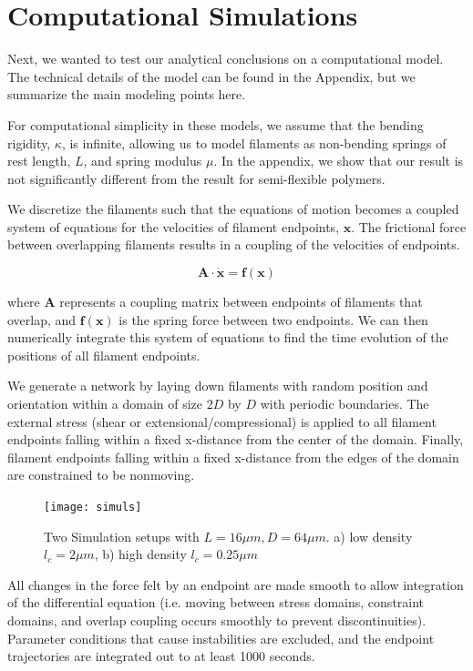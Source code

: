 \documentclass[prb,11pt]{revtex4-1}
\begin{document}
\section{Computational Simulations}

Next, we wanted to test our analytical conclusions on a computational model.  The technical details of the model can be found in the Appendix, but we summarize the main modeling points here.

For computational simplicity in these models, we assume that the bending rigidity, $\kappa$, is infinite, allowing us to model filaments as non-bending springs of rest length, $L$, and spring modulus $\mu$.  In the appendix, we show that our result is not significantly different from the result for semi-flexible polymers.

We discretize the filaments such that the equations of motion becomes a coupled system of equations for the velocities of filament endpoints, $\mathbf{x}$.  The frictional force between overlapping filaments results in a coupling of the velocities of endpoints.  

\begin{equation}
\mathbf{A \cdot \dot x} = \mathbf{f(x)}
\end{equation}

where $\mathbf{A }$ represents a coupling matrix between endpoints of filaments that overlap, and $\mathbf{f(x)}$ is the spring force between two endpoints.  We can then numerically integrate this system of equations to find the time evolution of the positions of all filament endpoints.

We generate a network by laying down filaments with random position and orientation within a domain of size $2D$ by $D$ with periodic boundaries.  The external stress (shear or extensional/compressional) is applied to all filament endpoints falling within a fixed x-distance from the center of the domain.  Finally, filament endpoints falling within a fixed x-distance from the edges of the domain are constrained to be nonmoving.

\begin{figure}[h!]
\centering
\texttt{[image: simuls]}
\caption{\label{fig:sim}Two Simulation setups with $L=16 \mu m, D = 64 \mu m$. a) low density $l_c=2 \mu m$, b) high density $l_c=0.25 \mu m$ }
\end{figure}


All changes in the force felt by an endpoint are made smooth to allow integration of the differential equation (i.e. moving between stress domains, constraint domains, and overlap coupling occurs smoothly to prevent discontinuities).  Parameter conditions that cause instabilities are excluded, and the endpoint trajectories are integrated out to at least 1000 seconds. 
\end{document}
